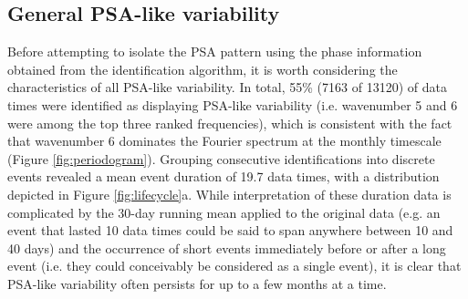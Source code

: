 \subsection{General PSA-like variability}

Before attempting to isolate the PSA pattern using the phase information obtained from the identification algorithm, it is worth considering the characteristics of all PSA-like variability. In total, 55\% (7163 of 13120) of data times were identified as displaying PSA-like variability (i.e. wavenumber 5 and 6 were among the top three ranked frequencies), which is consistent with the fact that wavenumber 6 dominates the Fourier spectrum at the monthly timescale (Figure \ref{fig:periodogram}). Grouping consecutive identifications into discrete events revealed a mean event duration of 19.7 data times, with a distribution depicted in Figure \ref{fig:lifecycle}a. While interpretation of these duration data is complicated by the 30-day running mean applied to the original data (e.g. an event that lasted 10 data times could be said to span anywhere between 10 and 40 days) and the occurrence of short events immediately before or after a long event (i.e. they could conceivably be considered as a single event), it is clear that PSA-like variability often persists for up to a few months at a time.     

